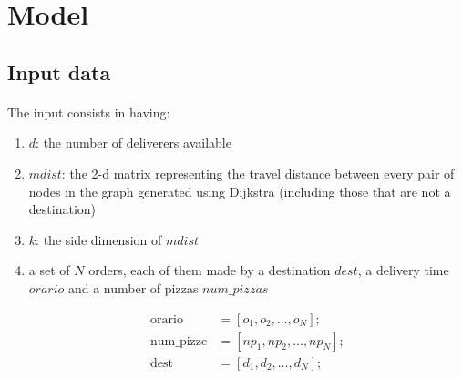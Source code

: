 \documentclass[10pt]{article}
\begin{document}
	\section{Model}
	\label{Model}

	
	\subsection{Input data}

	\paragraph*{}
	The input consists in having:
	\begin{enumerate}
		\item $d$: the number of deliverers available
		\item $mdist$: the 2-d matrix representing the travel distance between
			every pair of nodes in the graph generated using Dijkstra (including those
			that are not a destination)
		\item $k$: the side dimension of $mdist$
		\item a set of $N$ orders, each of them made by a destination $dest$, a delivery 
			time $orario$ and a number of pizzas $num\_pizzas$

			\begin{equation*}
				\begin{split}
					\text{orario} &= [o_1, o_2, \dots, o_N];\\
					\text{num\_pizze} &= [np_1, np_2, \dots, np_N];\\
					\text{dest} &= [d_1, d_2, \dots, d_N];
				\end{split}
			\end{equation*}

	\end{enumerate}
\end{document}
